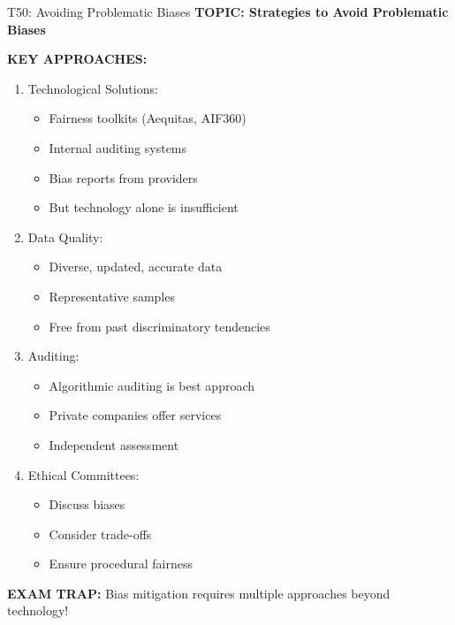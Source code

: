 \documentclass[8pt]{beamer}
\begin{document}
	\begin{frame}{T50: Avoiding Problematic Biases}
		\fontsize{6.5}{7.5}\selectfont
		\textbf{TOPIC: Strategies to Avoid Problematic Biases}
		
		\vspace{0.1cm}
		\textbf{KEY APPROACHES:}
		\begin{enumerate}
			\item \textcolor{myblue}{Technological Solutions:}
			\begin{itemize}
				\item Fairness toolkits (Aequitas, AIF360)
				\item Internal auditing systems
				\item Bias reports from providers
				\item But technology alone is insufficient
			\end{itemize}
			\item \textcolor{myblue}{Data Quality:}
			\begin{itemize}
				\item Diverse, updated, accurate data
				\item Representative samples
				\item Free from past discriminatory tendencies
			\end{itemize}
			\item \textcolor{myblue}{Auditing:}
			\begin{itemize}
				\item Algorithmic auditing is best approach
				\item Private companies offer services
				\item Independent assessment
			\end{itemize}
			\item \textcolor{myblue}{Ethical Committees:}
			\begin{itemize}
				\item Discuss biases
				\item Consider trade-offs
				\item Ensure procedural fairness
			\end{itemize}
		\end{enumerate}
		
		\textcolor{myred}{\textbf{EXAM TRAP:}} Bias mitigation requires \textcolor{myblue}{multiple approaches beyond technology}!
	\end{frame}
	
	
\end{document}
